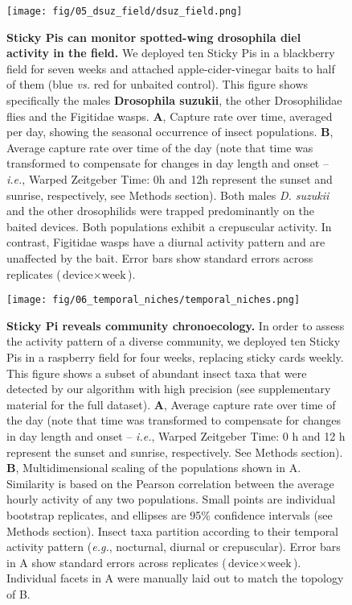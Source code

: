 \documentclass[12pt]{article}
\begin{document}
	\pagebreak

	\begin{figure}[ht]
		\centering
		\texttt{[image: fig/05\_dsuz\_field/dsuz\_field.png]}
		\caption{\textbf{Sticky Pis can monitor spotted-wing drosophila diel activity in the field.} We deployed ten Sticky Pis in a blackberry field for seven weeks and attached apple-cider-vinegar baits to half of them (blue \emph{vs.} red for unbaited control). This figure shows specifically the males \textbf{Drosophila suzukii}, the other Drosophilidae flies and the Figitidae wasps. \textbf{A}, Capture rate over time, averaged per day, showing the seasonal occurrence of insect populations. \textbf{B}, Average capture rate over time of the day (note that time was transformed to compensate for changes in day length and onset – \emph{i.e.}, Warped Zeitgeber Time: 0h and 12h represent the sunset and sunrise, respectively, see Methods section). Both males \emph{D. suzukii} and the other drosophilids were trapped predominantly on the baited devices. Both populations exhibit a crepuscular activity. In contrast, Figitidae wasps have a diurnal activity pattern and are unaffected by the bait. Error bars show standard errors across replicates ($\text{device} \times{} \text{week}$).}
		\label{fig:05}
	\end{figure}

	\pagebreak

	\begin{figure}[ht]
		\centering
		\texttt{[image: fig/06\_temporal\_niches/temporal\_niches.png]}
		\caption{\textbf{Sticky Pi reveals community chronoecology.} In order to assess the activity pattern of a diverse community, we deployed ten Sticky Pis in a raspberry field for four weeks, replacing sticky cards weekly. This figure shows a subset of abundant insect taxa that were detected by our algorithm with high precision (see supplementary material for the full dataset). \textbf{A}, Average capture rate over time of the day (note that time was transformed to compensate for changes in day length and onset – \emph{i.e.}, Warped Zeitgeber Time: 0 h and 12 h represent the sunset and sunrise, respectively. See Methods section). \textbf{B}, Multidimensional scaling of the populations shown in A. Similarity is based on the Pearson correlation between the average hourly activity of any two populations. Small points are individual bootstrap replicates, and ellipses are 95\% confidence intervals (see Methods section). Insect taxa partition according to their temporal activity pattern (\emph{e.g.}, nocturnal, diurnal or crepuscular). Error bars in A show standard errors across replicates ($\text{device} \times{} \text{week}$). Individual facets in A were manually laid out to match the topology of B.}
		\label{fig:06}
	\end{figure}
	\pagebreak
\end{document}
